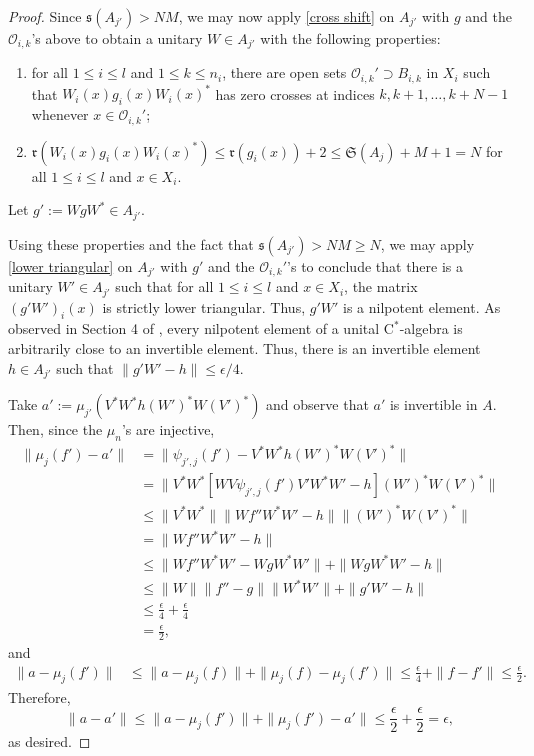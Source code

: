 \documentclass[12pt]{amsart}
\numberwithin{equation}{section}
\theoremstyle{definition}
\theoremstyle{remark}
\begin{document}
\begin{proof}
	Since $\mathfrak{s}(A_{j'})>NM$, we may now apply \autoref{cross shift} on $A_{j'}$ with $g$ and the $\mathcal{O}_{i,k}$'s above to obtain a unitary $W\in A_{j'}$ with the following properties:
	\begin{enumerate}[label=(\Roman*)]
		\item for all $1\leq i\leq l $ and $1\leq k\leq n_{i}$, there are open sets $\mathcal{O}_{i,k}'\supset B_{i,k}$ in $X_{i}$ such that $W_{i}(x)g_{i}(x)W_{i}(x)^{*}$ has zero crosses at indices $k,k+1,\ldots,k+N-1$ whenever $x\in \mathcal{O}_{i,k}'$;
		\item $\mathfrak{r}(W_{i}(x)g_{i}(x)W_{i}(x)^{*})\leq \mathfrak{r}(g_{i}(x))+2\leq\mathfrak{S}(A_{j})+M+1=N$ for all $1\leq i\leq  l $ and $x\in X_{i}$.
	\end{enumerate} 
	Let $g':=WgW^{*}\in A_{j'}$. 
	
	Using these properties and the fact that $\mathfrak{s}(A_{j'})>NM\geq N$, we may apply \autoref{lower triangular} on $A_{j'}$ with $g'$ and the $\mathcal{O}_{i,k}'$'s to conclude that there is a unitary $W'\in A_{j'}$ such that for all $1\leq i\leq  l $ and $x\in X_{i}$, the matrix $(g'W')_{i}(x)$ is strictly lower triangular. Thus, $g'W'$ is a nilpotent element. As observed in Section 4 of \cite{Ror}, every nilpotent element of a unital $\mathrm{C}^*$-algebra is arbitrarily close to an invertible element. Thus, there is an invertible element $h\in A_{j'}$ such that $\|g'W'-h\|\leq\epsilon/4$.
	
	Take $a':=\mu_{j'}(V^{*}W^{*}h(W')^{*}W(V')^{*})$ and observe that $a'$ is invertible in $A$. Then, since the $\mu_{n}$'s are injective,
	$$
	\begin{aligned}
	\|\mu_{j}(f')-a'\|&=\|\psi_{j',j}(f')-V^{*}W^{*}h(W')^{*}W(V')^{*}\|\\
	&=\|V^{*}W^{*}[WV\psi_{j',j}(f')V'W^{*}W'-h](W')^{*}W(V')^{*}\|\\
	&\leq\|V^{*}W^{*}\|\|Wf''W^{*}W'-h\|\|(W')^{*}W(V')^{*}\|\\
	&=\|Wf''W^{*}W'-h\|\\
	&\leq\|Wf''W^{*}W'-WgW^{*}W'\|+\|WgW^{*}W'-h\|\\
	&\leq\|W\|\|f''-g\|\|W^{*}W'\|+\|g'W'-h\|\\
	&\leq\frac{\epsilon}{4}+\frac{\epsilon}{4}\\
	&=\frac{\epsilon}{2},
	\end{aligned}
	$$
	and
	$$
	\begin{aligned}
	\|a-\mu_{j}(f')\|&\leq\|a-\mu_{j}(f)\|+\|\mu_{j}(f)-\mu_{j}(f')\|
	\leq \frac{\epsilon}{4}+\|f-f'\|
	\leq\frac{\epsilon}{2}.
	\end{aligned}
	$$
	Therefore, 
	$$
	\|a-a'\|\leq \|a-\mu_{j}(f')\|+\|\mu_{j}(f')-a'\|\leq\frac{\epsilon}{2}+\frac{\epsilon}{2}=\epsilon,
	$$
	as desired. 
\end{proof}
\end{document}
